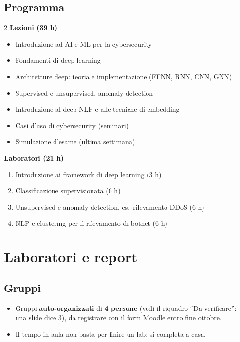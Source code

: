 \subsection{Programma}
\begin{multicols}{2}
\textbf{Lezioni (39 h)}
\begin{itemize}
  \item Introduzione ad AI e ML per la cybersecurity
  \item Fondamenti di deep learning
  \item Architetture deep: teoria e implementazione (FFNN, RNN, CNN, GNN)
  \item Supervised e unsupervised, anomaly detection
  \item Introduzione al deep NLP e alle tecniche di embedding
  \item Casi d'uso di cybersecurity (seminari)
  \item Simulazione d'esame (ultima settimana)
\end{itemize}
\columnbreak
\textbf{Laboratori (21 h)}
\begin{enumerate}
  \item Introduzione ai framework di deep learning (3 h)
  \item Classificazione supervisionata (6 h)
  \item Unsupervised e anomaly detection, es.\ rilevamento DDoS (6 h)
  \item NLP e clustering per il rilevamento di botnet (6 h)
\end{enumerate}
\end{multicols}

\section{Laboratori e report}

\subsection{Gruppi}
\begin{itemize}
  \item Gruppi \textbf{auto-organizzati} di \textbf{4 persone} (vedi il riquadro ``Da verificare'':
        una slide dice 3), da registrare con il form Moodle entro fine ottobre.
  \item Il tempo in aula non basta per finire un lab: si completa a casa.
\end{itemize}

